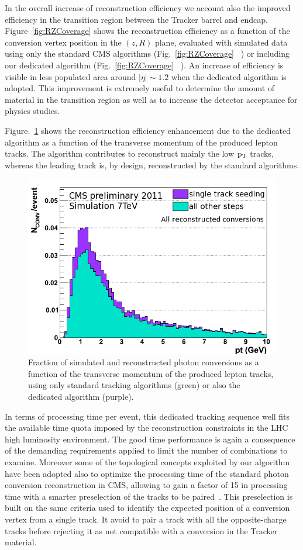 \documentclass[a4paper]{jpconf}
\begin{document}
In the overall increase of reconstruction efficiency we account also the improved efficiency in the transition region between the Tracker barrel and endcap.  
Figure~\ref{fig:RZCoverage} shows the reconstruction efficiency as a function of the conversion vertex position in the $(z,R)$ plane, evaluated with simulated data using only the standard CMS algorithms (Fig.~\ref{fig:RZCoverage}~ ) or including our dedicated algorithm (Fig.~\ref{fig:RZCoverage}~ ). An increase of efficiency is visible in less populated area around $|\eta| \sim 1.2$ when the dedicated algorithm is adopted. This improvement is extremely useful to determine  the amount of material in the transition region as well as to increase the detector acceptance for physics studies.



Figure.~\ref{fig:ptPerf} shows the reconstruction efficiency enhancement due to the  dedicated algorithm as a function of the transverse momentum of the produced lepton tracks. The algorithm contributes to reconstruct mainly the low $\rm p_T$ tracks, whereas the leading track is, by design, reconstructed by the standard algorithms.

\begin{figure}[h]
\centering
\includegraphics[width=.45\textwidth]{fig/algo_pt_Lin_Reco_All_mod.png}
\caption{Fraction of simulated and reconstructed photon conversions as a function of the transverse momentum of the produced lepton tracks, using only standard tracking algorithms (green) or also the dedicated algorithm (purple). }
\label{fig:ptPerf}
\end{figure}





In terms of processing time per event, this dedicated tracking sequence well fits the available time quota imposed by the reconstruction constraints in the LHC high luminosity  environment.  The good time performance is again a consequence of the demanding requirements applied to limit the number of combinations to examine.
Moreover some of the topological concepts exploited by our algorithm have been adopted also to optimize the processing time of the standard photon conversion reconstruction  in CMS, allowing to gain a factor of 15 in processing time with a smarter preselection of the tracks to be paired~\cite{recoImprovement}. This preselection is built on the same criteria used to identify the expected position of a conversion vertex from a single track. It avoid to pair a track with all the opposite-charge tracks before rejecting it as not compatible with a conversion in the Tracker material.
\end{document}

